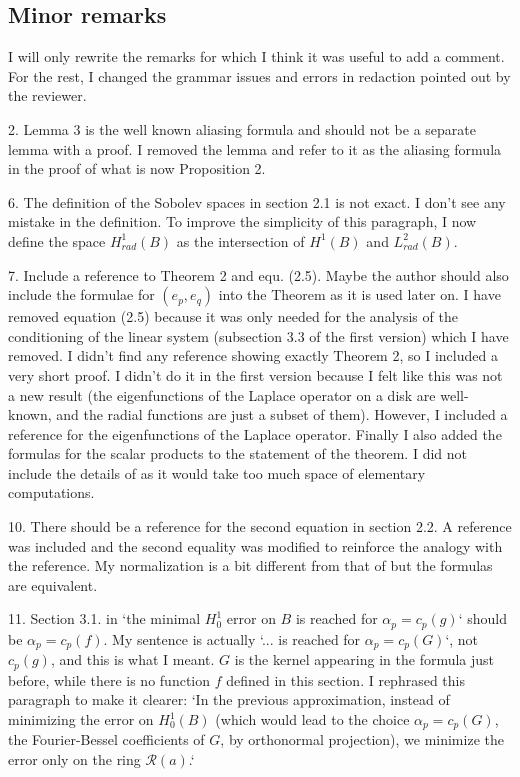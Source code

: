 \documentclass[10pt]{article}
\begin{document}
\subsection*{Minor remarks}
I will only rewrite the remarks for which I think it was useful to add a comment. For the rest, I changed the grammar issues and errors in redaction pointed out by the reviewer. 

\begin{response}
	{2. Lemma 3 is the well known aliasing formula and should not be a separate
		lemma with a proof.}
	I removed the lemma and refer to it as the aliasing formula in the proof of what is now Proposition 2. 
\end{response}
\begin{response}{6. The definition of the Sobolev spaces in section 2.1 is not exact.}
	I don't see any mistake in the definition. To improve the simplicity of this paragraph, I now define the space $H^1_\textit{rad}(B)$ as the intersection of $H^1(B)$ and $L^2_{\textit{rad}}(B)$. 
\end{response}
\begin{response}{7. Include a reference to Theorem 2 and equ. (2.5). Maybe the author should
		also include the formulae for $(e_p,e_q)$ into the Theorem as it is used later on.}
	I have removed equation (2.5) because it was only needed for the analysis of the conditioning of the linear system (subsection 3.3 of the first version) which I have removed. I didn't find any reference showing exactly Theorem 2, so I included a very short proof. I didn't do it in the first version because I felt like this was not a new result (the eigenfunctions of the Laplace operator on a disk are well-known, and the radial functions are just a subset of them). However, I included a reference for the eigenfunctions of the Laplace operator. Finally I also added the formulas for the scalar products to the statement of the theorem. I did not include the details of as it would take too much space of elementary computations. 
\end{response}
\begin{response}
	{10. There should be a reference for the second equation in section 2.2.}
	A reference was included and the second equality was modified to reinforce the analogy with the reference. My normalization is a bit different from that of \cite{watson1995treatise} but the formulas are equivalent. 
\end{response}
\begin{response}
	{11. Section 3.1. in `the minimal $H_0^1$ error on $B$ is reached for $\alpha_p = c_p (g)$` should be $\alpha_p = c_p (f)$.}
	My sentence is actually `... is reached for $\alpha_p = c_p (G)$`, not $c_p(g)$, and this is what I meant. $G$ is the kernel appearing in the formula just before, while there is no function $f$ defined in this section. I rephrased this paragraph to make it clearer: `In the previous approximation, instead of minimizing the error on  $H^1_0(B)$ (which would lead to the choice $\alpha_p = c_p(G)$, the Fourier-Bessel coefficients of $G$, by orthonormal projection), we minimize the error only on the ring $\mathcal{R}(a)$.`
\end{response}
\end{document}
